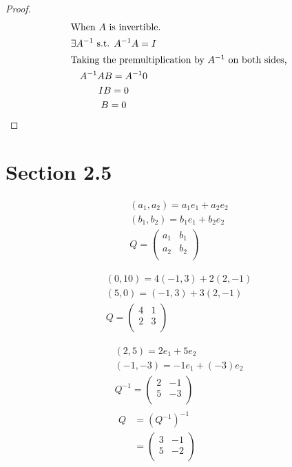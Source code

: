 \documentclass[12pt]{article}
\newenvironment{problem}[2][Problem]{\begin{trivlist}
\item[\hskip \labelsep {\bfseries #1}\hskip \labelsep {\bfseries #2.}]}{\end{trivlist}}
\begin{document}
\begin{problem}{6}
\end{problem}
\begin{proof}
\begin{gather*}
	\intertext{When $A$ is invertible.} 
	\exists A^{-1} \text{ s.t. } A^{-1} A = I \\
	\intertext{Taking the premultiplication by $A^{-1}$ on both sides,}
	A^{-1} A B = A^{-1} 0 \\
	I B = 0 \\
	B = 0
\end{gather*}
\end{proof}
\filbreak

\section*{Section 2.5}

\begin{problem}{2.a}
\end{problem}
\begin{gather*}
	(a_1, a_2) = a_1 e_1 + a_2 e_2 \\
	(b_1, b_2) = b_1 e_1 + b_2 e_2 \\
	Q= \left( \begin{array}{cc} 
		a_1 & b_1\\
		a_2 & b_2\\
	\end{array} \right)
\end{gather*}
\filbreak

\begin{problem}{2.b}
\end{problem}
\begin{gather*}
	(0, 10) = 4(-1,3) + 2(2, -1) \\
	(5, 0) = (-1,3) + 3(2, -1) \\
	Q= \left( \begin{array}{cc} 
		4 & 1\\
		2 & 3\\
	\end{array} \right)
\end{gather*}
\filbreak

\begin{problem}{2.c}
\end{problem}
\begin{gather*}
	(2, 5) = 2 e_1 + 5 e_2 \\
	(-1, -3) = -1 e_1 + (-3) e_2 \\
	Q^{-1} = \left( \begin{array}{cc} 
		2 & -1\\
		5 & -3\\
	\end{array} \right) \\
	\begin{align*}
		Q&= (Q^{-1})^{-1} &\\
		&= \left( \begin{array}{cc} 
			3 & -1\\
			5 & -2\\
		\end{array} \right)
	\end{align*}
\end{gather*}
\filbreak
\end{document}
